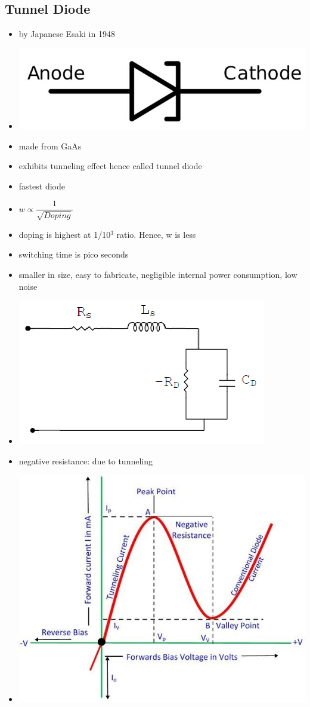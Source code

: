 \documentclass[10pt, a4paper]{report}
\begin{document}
	\subsection{Tunnel Diode}
	\begin{itemize}
		\item by Japanese Esaki in 1948
		\item \includegraphics[width=0.2\linewidth]{img/Tunnel-Diode}
		\item made from GaAs
		\item exhibits tunneling effect hence called tunnel diode
		\item fastest diode
		\item $ w \propto \dfrac{1}{\sqrt{Doping}} $
		\item doping is highest at 1/10$ ^3 $ ratio. Hence, w is less
		\item switching time is pico seconds
		\item smaller in size, easy to fabricate, negligible internal power consumption, low noise
		\item \includegraphics{img/Equivalent-circuit-of-Tunnel-diode}
		\item negative resistance: due to tunneling
		\item \includegraphics[width=\linewidth]{img/Tunnel-Diode-I-V-Characteristics} \\

\end{itemize}
\end{document}
